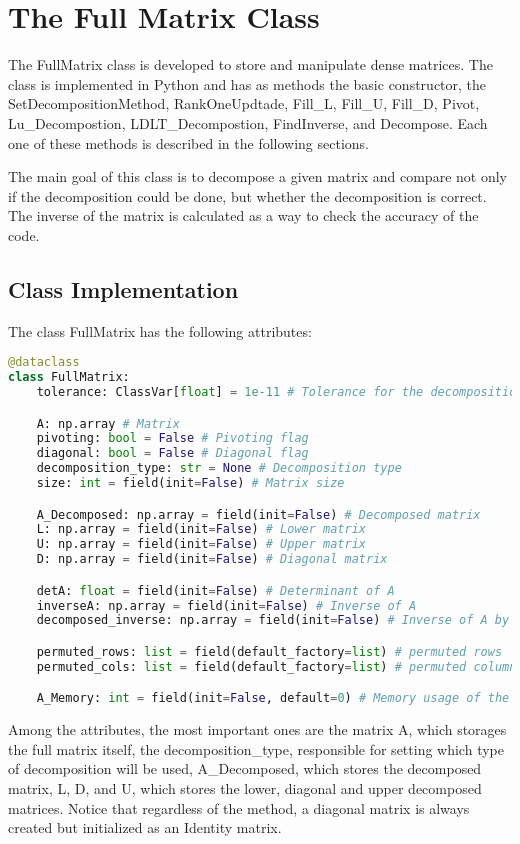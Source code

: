\section{The Full Matrix Class}\label{sec:fullmatrix}
The FullMatrix class is developed to store and manipulate dense matrices. The class is implemented in Python and has as methods the basic constructor, the SetDecompositionMethod, RankOneUpdtade, Fill\_L, Fill\_U, Fill\_D, Pivot, Lu\_Decompostion, LDLT\_Decompostion, FindInverse, and Decompose. Each one of these methods is described in the following sections. 

The main goal of this class is to decompose a given matrix and compare not only if the decomposition could be done, but whether the decomposition is correct. The inverse of the matrix is calculated as a way to check the accuracy of the code. 
\subsection{Class Implementation} \label{sec:fullmatrix_implementation}
The class FullMatrix has the following attributes: 
\begin{lstlisting}[language=Python, caption={FullMatrix constructor.}, label={code:main}] 
@dataclass
class FullMatrix:
    tolerance: ClassVar[float] = 1e-11 # Tolerance for the decomposition

    A: np.array # Matrix
    pivoting: bool = False # Pivoting flag
    diagonal: bool = False # Diagonal flag
    decomposition_type: str = None # Decomposition type
    size: int = field(init=False) # Matrix size

    A_Decomposed: np.array = field(init=False) # Decomposed matrix
    L: np.array = field(init=False) # Lower matrix
    U: np.array = field(init=False) # Upper matrix
    D: np.array = field(init=False) # Diagonal matrix

    detA: float = field(init=False) # Determinant of A
    inverseA: np.array = field(init=False) # Inverse of A
    decomposed_inverse: np.array = field(init=False) # Inverse of A by decomposition

    permuted_rows: list = field(default_factory=list) # permuted rows
    permuted_cols: list = field(default_factory=list) # permuted columns

    A_Memory: int = field(init=False, default=0) # Memory usage of the matrix
\end{lstlisting}

Among the attributes, the most important ones are the matrix A, which storages the full matrix itself, the decomposition\_type, responsible for setting which type of decomposition will be used, A\_Decomposed, which stores the decomposed matrix, L, D, and U, which stores the lower, diagonal and upper decomposed matrices. Notice that regardless of the method, a diagonal matrix is always created but initialized as an Identity matrix. 

